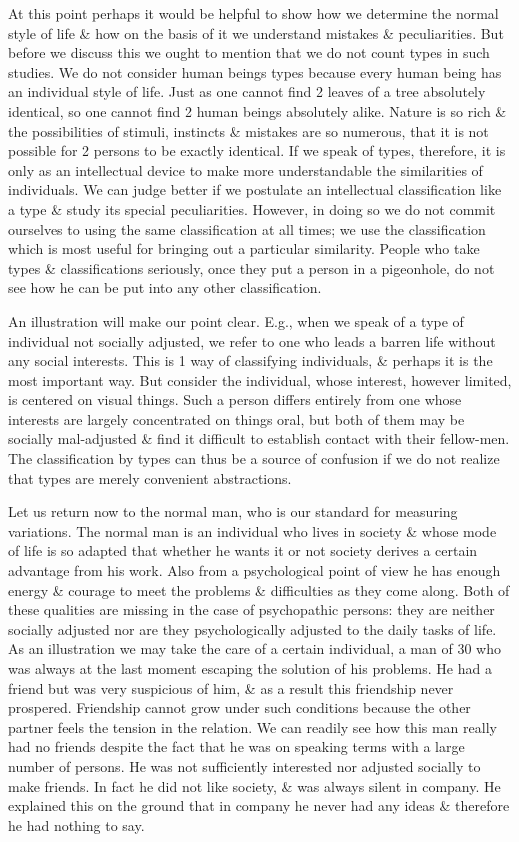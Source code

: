 \documentclass{article}
\begin{document}
At this point perhaps it would be helpful to show how we determine the normal style of life \& how on the basis of it we understand mistakes \& peculiarities. But before we discuss this we ought to mention that we do not count types in such studies. We do not consider human beings types because every human being has an individual style of life. Just as one cannot find 2 leaves of a tree absolutely identical, so one cannot find 2 human beings absolutely alike. Nature is so rich \& the possibilities of stimuli, instincts \& mistakes are so numerous, that it is not possible for 2 persons to be exactly identical. If we speak of types, therefore, it is only as an intellectual device to make more understandable the similarities of individuals. We can judge better if we postulate an intellectual classification like a type \& study its special peculiarities. However, in doing so we do not commit ourselves to using the same classification at all times; we use the classification which is most useful for bringing out a particular similarity. People who take types \& classifications seriously, once they put a person in a pigeonhole, do not see how he can be put into any other classification.

An illustration will make our point clear. E.g., when we speak of a type of individual not socially adjusted, we refer to one who leads a barren life without any social interests. This is 1 way of classifying individuals, \& perhaps it is the most important way. But consider the individual, whose interest, however limited, is centered on visual things. Such a person differs entirely from one whose interests are largely concentrated on things oral, but both of them may be socially mal-adjusted \& find it difficult to establish contact with their fellow-men. The classification by types can thus be a source of confusion if we do not realize that types are merely convenient abstractions.

Let us return now to the normal man, who is our standard for measuring variations. The normal man is an individual who lives in society \& whose mode of life is so adapted that whether he wants it or not society derives a certain advantage from his work. Also from a psychological point of view he has enough energy \& courage to meet the problems \& difficulties as they come along. Both of these qualities are missing in the case of psychopathic persons: they are neither socially adjusted nor are they psychologically adjusted to the daily tasks of life. As an illustration we may take the care of a certain individual, a man of 30 who was always at the last moment escaping the solution of his problems. He had a friend but was very suspicious of him, \& as a result this friendship never prospered. Friendship cannot grow under such conditions because the other partner feels the tension in the relation. We can readily see how this man really had no friends despite the fact that he was on speaking terms with a large number of persons. He was not sufficiently interested nor adjusted socially to make friends. In fact he did not like society, \& was always silent in company. He explained this on the ground that in company he never had any ideas \& therefore he had nothing to say.
\end{document}
